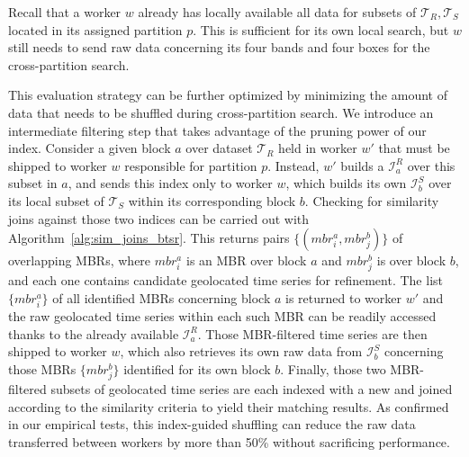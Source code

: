 Recall that a worker $w$ already has locally available all data for subsets of $\mathcal{T}_{R}, \mathcal{T}_{S}$ located in its assigned partition $p$. This is sufficient for its own local search, but $w$ still needs to send raw data concerning its four bands and four boxes for the cross-partition search.

This evaluation strategy can be further optimized by minimizing the amount of data that needs to be shuffled during cross-partition search. We introduce an intermediate filtering step that takes advantage of the pruning power of our \btsr index. Consider a given block $a$ over dataset $\mathcal{T}_{R}$ held in worker $w'$ that must be shipped to worker $w$ responsible for partition $p$. Instead, $w'$ builds a \btsr $\mathcal{I}_{a}^{R}$ over this subset in $a$, and sends this index only to worker $w$, which builds its own \btsr $\mathcal{I}_{b}^{S}$ over its local subset of $\mathcal{T}_{S}$ within its corresponding block $b$. Checking for similarity joins against those two indices can be carried out with Algorithm~\ref{alg:sim_joins_btsr}. This returns pairs $\{ (mbr^{a}_{i}, mbr^{b}_{j}) \}$ of overlapping MBRs, where $mbr^{a}_{i}$ is an MBR over block $a$ and $mbr^{b}_{j}$ is over block $b$, and each one contains candidate geolocated time series for refinement. The list $\{ mbr^{a}_{i} \}$ of all identified  MBRs concerning block $a$ is returned to worker $w'$ and the raw geolocated time series within each such MBR can be readily accessed thanks to the already available \btsr $\mathcal{I}_{a}^{R}$. Those MBR-filtered time series are then shipped to worker $w$, which also retrieves its own raw data from \btsr $\mathcal{I}_{b}^{S}$ concerning those MBRs $\{ mbr^{b}_{j} \}$ identified for its own block $b$. Finally, those two MBR-filtered subsets of geolocated time series are each indexed with a new {\btsr} and joined according to the similarity criteria to yield their matching results. As confirmed in our empirical tests, this index-guided shuffling can reduce the raw data transferred between workers by more than 50\% without sacrificing performance.